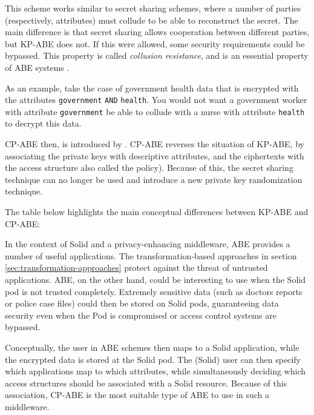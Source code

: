 

\noindent This scheme works similar to secret sharing schemes, where a number of parties (respectively, attributes) must collude to be able to reconstruct the secret. The main difference is that secret sharing allows cooperation between different parties, but \gls{KP-ABE} does not. If this were allowed, some security requirements could be bypassed. This property is called \textit{collusion resistance}, and is an essential property of \gls{ABE} systems \citep{cp-abe}. 

As an example, take the case of government health data that is encrypted with the attributes \texttt{government} \texttt{AND} \texttt{health}. You would not want a government worker with attribute \texttt{government} be able to collude with a nurse with attribute \texttt{health} to decrypt this data.

\acrlong{CP-ABE} then, is introduced by \citet{cp-abe}. \Gls{CP-ABE} reverses the situation of \gls{KP-ABE}, by associating the private keys with descriptive attributes, and the ciphertexts with the access structure also called the policy). Because of this, the secret sharing technique can no longer be used and \citeauthor{cp-abe} introduce a new private key randomization technique. 

The table below highlights the main conceptual differences between \gls{KP-ABE} and \gls{CP-ABE}:


\noindent In the context of Solid and a privacy-enhancing middleware, \gls{ABE} provides a number of useful applications. The transformation-based approaches in section \ref{sec:transformation-approaches} protect against the threat of untrusted applications. \Gls{ABE}, on the other hand, could be interesting to use when the Solid pod is not trusted completely. Extremely sensitive data (such as doctors reports or police case files) could then be stored on Solid pods, guaranteeing data security even when the Pod is compromised or access control systems are bypassed.

Conceptually, the user in \gls{ABE} schemes then maps to a Solid application, while the encrypted data is stored at the Solid pod. The (Solid) user can then specify which applications map to which attributes, while simultaneously deciding which access structures should be associated with a Solid resource. Because of this association, \gls{CP-ABE} is the most suitable type of \gls{ABE} to use in such a middleware.

